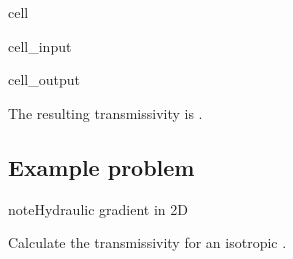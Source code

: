 \documentclass[letterpaper,10pt,english]{jupyterBook}
\begin{document}
\begin{sphinxuseclass}{cell}\begin{sphinxVerbatimInput}

\begin{sphinxuseclass}{cell_input}
\begin{sphinxVerbatim}[commandchars=\\\{\}]
   
   

  
\PYG{l+s+s2}{[1mSolution:}\PYG{l+s+s2}{[0m}\PYG{l+s+s2}{[1m}\PYG{l+s+s2}{[0m.}
\end{sphinxVerbatim}

\end{sphinxuseclass}\end{sphinxVerbatimInput}
\begin{sphinxVerbatimOutput}

\begin{sphinxuseclass}{cell_output}
\begin{sphinxVerbatim}[commandchars=\\\{\}]
The resulting transmissivity is .
\end{sphinxVerbatim}

\end{sphinxuseclass}\end{sphinxVerbatimOutput}

\end{sphinxuseclass}

\subsection{Example problem}
\label{\detokenize{content/flow/L7/17_quantify_flow:id2}}
\begin{sphinxadmonition}{note}{Hydraulic gradient in 2D}

\sphinxAtStartPar
Calculate the transmissivity for an isotropic .
\end{sphinxadmonition}
\end{document}
